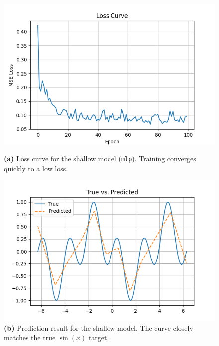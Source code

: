 \begin{figure}[ht]
  \centering
  \begin{minipage}{0.48\textwidth}
    \centering
    \includegraphics[width=\linewidth]{images/hydra1_mlp.png}
    \caption*{{\bf (a)} Loss curve for the shallow model (\texttt{mlp}). Training converges quickly to a low loss.}
  \end{minipage}
  \hfill
  \begin{minipage}{0.48\textwidth}
    \centering
    \includegraphics[width=\linewidth]{images/hydra2_mlp.png}
    \caption*{{\bf (b)} Prediction result for the shallow model. The curve closely matches the true $\sin(x)$ target.}
  \end{minipage}

  \vspace{1em}


\end{figure}
